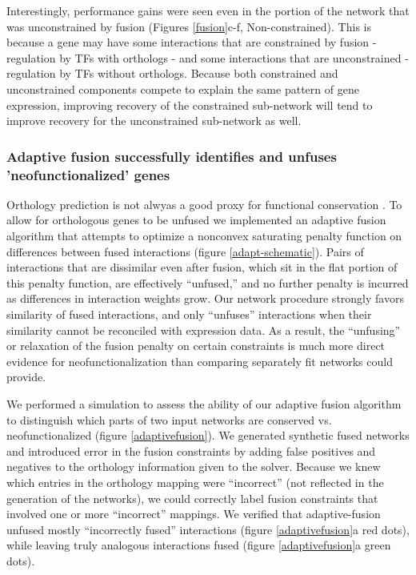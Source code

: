 \documentclass[11pt]{article}
\begin{document}
Interestingly, performance gains were seen even in the portion of the network that was unconstrained by fusion (Figures \ref{fusion}c-f, Non-constrained). This is because a gene may have some interactions that are constrained by fusion - regulation by TFs with orthologs - and some interactions that are unconstrained - regulation by TFs without orthologs. Because both constrained and unconstrained components compete to explain the same pattern of gene expression, improving recovery of the constrained sub-network will tend to improve recovery for the unconstrained sub-network as well.


\subsubsection{Adaptive fusion successfully identifies and unfuses 'neofunctionalized' genes}
Orthology prediction is not alwyas a good proxy for functional conservation \cite{gabaldon_functional_2013, studer_how_2009, nehrt_testing_2011}. 
To allow for orthologous genes to be unfused we implemented an adaptive fusion algorithm that attempts to optimize a nonconvex saturating penalty function on differences between fused interactions (figure \ref{adapt-schematic}). 
Pairs of interactions that are dissimilar even after fusion, which sit in the flat portion of this penalty function, are effectively ``unfused,'' and no further penalty is incurred as differences in interaction weights grow. 
Our network procedure strongly favors similarity of fused interactions, and only ``unfuses'' interactions when their similarity cannot be reconciled with expression data. 
As a result, the ``unfusing'' or relaxation of the fusion penalty on certain constraints is much more direct evidence for neofunctionalization than comparing separately fit networks could provide. 

We performed a simulation to assess the ability of our adaptive fusion algorithm to distinguish which parts of two input networks are conserved vs. neofunctionalized (figure \ref{adaptivefusion}). We generated synthetic fused networks and introduced error in the fusion constraints by adding false positives and negatives to the orthology information given to the solver. 
Because we knew which entries in the orthology mapping were ``incorrect'' (not reflected in the generation of the networks), we could correctly label fusion constraints that involved one or more ``incorrect'' mappings. 
We verified that adaptive-fusion unfused mostly ``incorrectly fused'' interactions (figure \ref{adaptivefusion}a red dots), while leaving truly analogous interactions fused (figure \ref{adaptivefusion}a green dots). 
\end{document}

